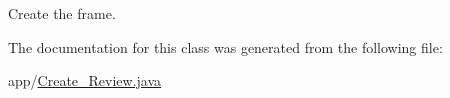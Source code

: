 Create the frame. 

The documentation for this class was generated from the following file\+:\begin{DoxyCompactItemize}
\item 
app/\mbox{\hyperlink{_create___review_8java}{Create\+\_\+\+Review.\+java}}\end{DoxyCompactItemize}
